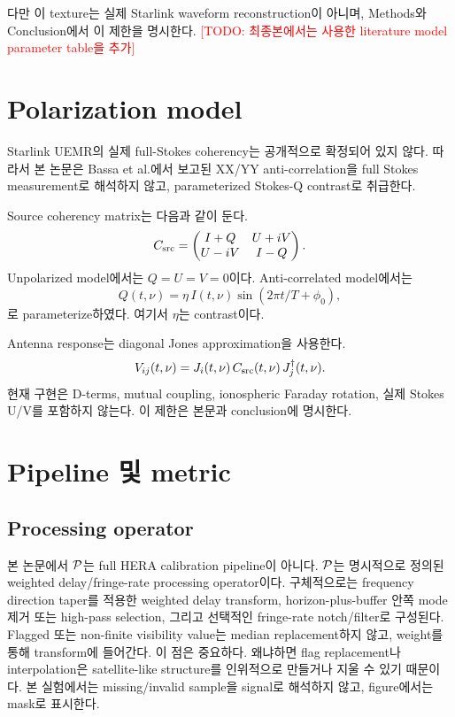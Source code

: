 \documentclass[11pt,a4paper]{article}
\newcommand{\todo}[1]{\textcolor{red}{[TODO: #1]}}
\newcommand{\vis}{V}
\begin{document}
다만 이 texture는 실제 Starlink waveform reconstruction이 아니며, Methods와 Conclusion에서 이 제한을 명시한다.
\todo{최종본에서는 사용한 literature model parameter table을 추가}

\section{Polarization model}

Starlink UEMR의 실제 full-Stokes coherency는 공개적으로 확정되어 있지 않다.
따라서 본 논문은 Bassa et al.에서 보고된 XX/YY anti-correlation을 full Stokes measurement로 해석하지 않고, parameterized Stokes-Q contrast로 취급한다.

Source coherency matrix는 다음과 같이 둔다.
\begin{equation}
  C_{\rm src}
  =
  \begin{pmatrix}
  I + Q & U+iV\\
  U-iV & I-Q
  \end{pmatrix}.
\end{equation}
Unpolarized model에서는 $Q=U=V=0$이다.
Anti-correlated model에서는
\begin{equation}
  Q(t,\nu)
  =
  \eta\,I(t,\nu)\sin(2\pi t/T+\phi_0),
\end{equation}
로 parameterize하였다.
여기서 $\eta$는 contrast이다.

Antenna response는 diagonal Jones approximation을 사용한다.
\begin{equation}
  \vis_{ij}(t,\nu)
  =
  J_i(t,\nu)\,C_{\rm src}(t,\nu)\,J_j^\dagger(t,\nu).
\end{equation}
현재 구현은 D-terms, mutual coupling, ionospheric Faraday rotation, 실제 Stokes U/V를 포함하지 않는다.
이 제한은 본문과 conclusion에 명시한다.

\section{Pipeline 및 metric}

\subsection{Processing operator}

본 논문에서 ${\cal P}$는 full HERA calibration pipeline이 아니다.
${\cal P}$는 명시적으로 정의된 weighted delay/fringe-rate processing operator이다.
구체적으로는 frequency direction taper를 적용한 weighted delay transform, horizon-plus-buffer 안쪽 mode 제거 또는 high-pass selection, 그리고 선택적인 fringe-rate notch/filter로 구성된다.
Flagged 또는 non-finite visibility value는 median replacement하지 않고, weight를 통해 transform에 들어간다.
이 점은 중요하다.
왜냐하면 flag replacement나 interpolation은 satellite-like structure를 인위적으로 만들거나 지울 수 있기 때문이다.
본 실험에서는 missing/invalid sample을 signal로 해석하지 않고, figure에서는 mask로 표시한다.
\end{document}
